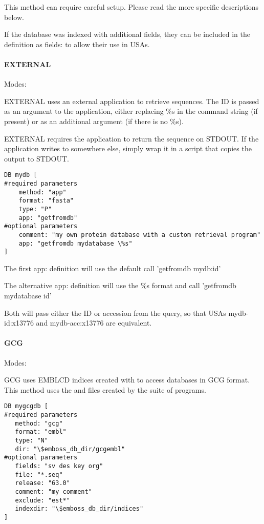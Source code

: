 \documentclass{report}
\begin{document}
This method can require careful setup. Please read the more specific
descriptions below.

If the database was indexed with additional fields, they can be
included in the definition as fields: to allow their use in USAs.

\paragraph{EXTERNAL}\par\noindent
Modes: \par\noindent EXTERNAL uses an external
application to retrieve sequences.  The ID is passed as an argument to
the application, either replacing \%s in the command string (if
present) or as an additional argument (if there is no \%s).

EXTERNAL requires the application to return the sequence on STDOUT. If
the application writes to somewhere else, simply wrap it in a script
that copies the output to STDOUT.

\begin{verbatim}
DB mydb [
#required parameters
    method: "app"
    format: "fasta"
    type: "P"
    app: "getfromdb"
#optional parameters
    comment: "my own protein database with a custom retrieval program"
    app: "getfromdb mydatabase \%s"
]
\end{verbatim}

The first app: definition will use the default call 'getfromdb mydb:id'

The alternative app: definition will use the \%s format and call
'getfromdb mydatabase id'

Both will pass either the ID or accession from the query, so that USAs
mydb-id:x13776 and mydb-acc:x13776 are equivalent.

\paragraph{GCG}\par\noindent
Modes: \par\noindent GCG uses EMBLCD indices created
with  to access databases in GCG format. This method
uses the  and  files created by the
 suite of programs.

\begin{verbatim}
DB mygcgdb [
#required parameters
   method: "gcg"
   format: "embl"
   type: "N"
   dir: "\$emboss_db_dir/gcgembl"
#optional parameters
   fields: "sv des key org"
   file: "*.seq"
   release: "63.0"
   comment: "my comment"
   exclude: "est*"
   indexdir: "\$emboss_db_dir/indices"
]
\end{verbatim}
\end{document}
